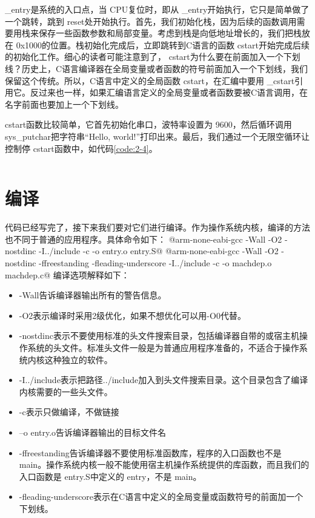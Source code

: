 \documentclass[main.tex]{subfiles}
\begin{document}
\begin{CJK*}{UTF8}{song}
\begin{code}
\label{code:2-3}
\inputminted[linenos,numbersep=5pt,frame=lines,framesep=2mm]{gas}{src/chapter02/kernel/entry.S}
\end{code}

 \_entry是系统的入口点，当 CPU复位时，即从 \_entry开始执行，它只是简单做了一个跳转，跳到 reset处开始执行。首先，我们初始化栈，因为后续的函数调用需要用栈来保存一些函数参数和局部变量。考虑到栈是向低地址增长的，我们把栈放在 0x1000的位置。栈初始化完成后，立即跳转到C语言的函数 cstart开始完成后续的初始化工作。细心的读者可能注意到了， cstart为什么要在前面加入一个下划线？历史上，C语言编译器在全局变量或者函数的符号前面加入一个下划线，我们保留这个传统。所以，C语言中定义的全局函数 cstart，在汇编中要用 \_cstart引用它。反过来也一样，如果汇编语言定义的全局变量或者函数要被C语言调用，在名字前面也要加上一个下划线。

\par
cstart函数比较简单，它首先初始化串口，波特率设置为 9600，然后循环调用 sys\_\-putchar把字符串“Hello, world!”打印出来。最后，我们通过一个无限空循环让控制停 cstart函数中，如代码\ref{code:2-4}。

\begin{code}
\label{code:2-4}
\inputminted[firstline=50,lastline=61,linenos,numbersep=5pt,frame=lines,framesep=2mm]{c}{src/chapter02/kernel/machdep.c}
\end{code}


\section{编译}
代码已经写完了，接下来我们要对它们进行编译。作为操作系统内核，编译的方法也不同于普通的应用程序。具体命令如下：
@arm-none-eabi-gcc -Wall -O2 -nostdinc -I../include -c -o entry.o entry.S@
@arm-none-eabi-gcc -Wall -O2 -nostdinc -ffreestanding -fleading-underscore -I../include -c -o machdep.o machdep.c@
\noindent
编译选项解释如下：
\begin{itemize}
	\item -Wall告诉编译器输出所有的警告信息。
	\item -O2表示编译时采用2级优化，如果不想优化可以用-O0代替。
	\item -nostdinc表示不要使用标准的头文件搜索目录，包括编译器自带的或宿主机操作系统的头文件。标准头文件一般是为普通应用程序准备的，不适合于操作系统内核这种独立的软件。
	\item -I../include表示把路径../include加入到头文件搜索目录。这个目录包含了编译内核需要的一些头文件。
	\item -c表示只做编译，不做链接
	\item –o entry.o告诉编译器输出的目标文件名
	\item -ffreestanding告诉编译器不要使用标准函数库，程序的入口函数也不是 main。操作系统内核一般不能使用宿主机操作系统提供的库函数，而且我们的入口函数是 entry.S中定义的 entry，不是 main。
	\item -fleading-underscore表示在C语言中定义的全局变量或函数符号的前面加一个下划线。
\end{itemize}


\end{CJK*}
\end{document}
